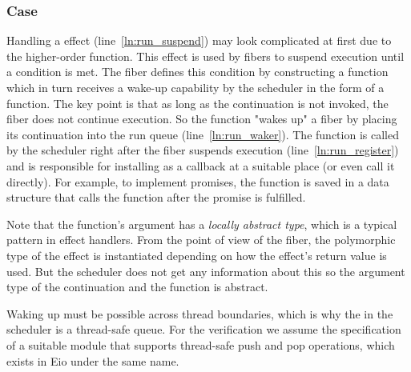 \subsubsection*{\esuspend{} Case}
Handling a \esuspend{} effect (line~\ref{ln:run_suspend}) may look complicated at first due to the higher-order  function.
This effect is used by fibers to suspend execution until a condition is met.
The fiber defines this condition by constructing a  function which in turn receives a wake-up capability by the scheduler in the form of a  function.
The key point is that as long as the continuation  is not invoked, the fiber does not continue execution.
So the  function "wakes up" a fiber by placing its continuation  into the run queue (line~\ref{ln:run_waker}).
The  function is called by the scheduler right after the fiber suspends execution (line~\ref{ln:run_register}) and is responsible for installing  as a callback at a suitable place (or even call it directly).
For example, to implement promises, the  function is saved in a data structure that calls the function after the promise is fulfilled.

Note that the  function's argument  has a \emph{locally abstract type}, which is a typical pattern in effect handlers.
From the point of view of the fiber, the polymorphic type  of the \esuspend{} effect is instantiated depending on how the effect's return value is used.
But the scheduler does not get any information about this so the argument type of the continuation  and the  function is abstract.

Waking up must be possible across thread boundaries, which is why the  in the scheduler is a thread-safe queue.
For the verification we assume the specification of a suitable  module that supports thread-safe push and pop operations, which exists in Eio under the same name.


\subsubsection{}
\label{sec:sched-impl-fork}

